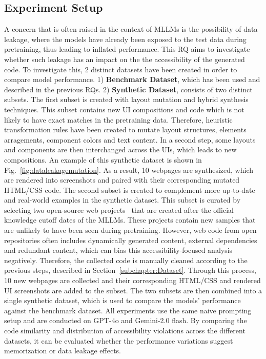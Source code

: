 \subsection{Experiment Setup}
A concern that is often raised in the context of MLLMs is 
the possibility of data leakage, where the models have 
already been exposed to the test data during pretraining, 
thus leading to inflated performance. This RQ aims to 
investigate whether such leakage has an impact on the
the accessibility of the generated code.\newline
To investigate this, 2 distinct datasets have been created 
in order to compare model performance. 1) \textbf{Benchmark Dataset},
which has been used and described in the previous RQs. 2)
\textbf{Synthetic Dataset}, consists of two distinct 
subsets. The first subset is
created with layout mutation and 
hybrid synthesis techniques. This subset contains new 
UI compositions and code which is not likely to have 
exact matches in the pretraining data. Therefore, 
heuristic transformation rules have been created to 
mutate layout structures, elements arragements,
component colors and text content. In a second step,
some layouts and components are then interchanged across 
the UIs, which leads to new compositions. An example 
of this synthetic dataset is shown in Fig.~\ref{fig:dataleakagemutation}.
As a result, 10 webpages are synthesized, which are 
rendered into screenshots and paired with their 
corresponding mutated HTML/CSS code. 
The second subset is created to complement 
more up-to-date and real-world examples in the synthetic 
dataset. This subset is curated by selecting two 
open-source web projects~\cite{web:alphaonelabsedu, web:ecommerceferhan}
that are created after the official knowledge cutoff 
dates of the MLLMs. These projects contain new samples 
that are unlikely to have been seen during pretraining.
However, web code from open repositories often 
includes dynamically generated content, external dependencies 
and redundant content, which can bias this accessibility-focused 
analysis negatively. Therefore, the collected code 
is manually cleaned according to the previous 
steps, described in Section~\ref{subchapter:Dataset}.
Through this process, 10 new webpages are collected and
their corresponding HTML/CSS and rendered UI screenshots 
are added to the subset.\newline
The two subsets are then combined into a single 
synthetic dataset, which is used to compare the 
models' performance against the benchmark dataset.\newline
All experiments use the same naive prompting setup 
and are conducted on GPT-4o and Gemini-2.0 flash. 
By comparing the code similarity and distribution of 
accessibility violations across the 
different datasets, it can be evaluated 
whether the performance variations suggest
memorization or data leakage effects.

